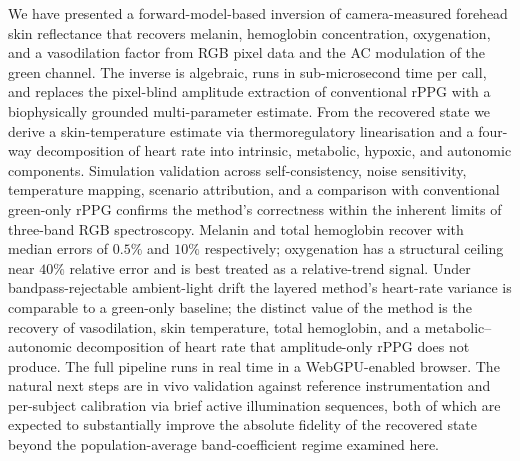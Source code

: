 \documentclass[10pt,twocolumn,a4paper]{article}
\theoremstyle{definition}
\begin{document}
We have presented a forward-model-based inversion of camera-measured
forehead skin reflectance that recovers melanin, hemoglobin
concentration, oxygenation, and a vasodilation factor from RGB pixel
data and the AC modulation of the green channel. The inverse is
algebraic, runs in sub-microsecond time per call, and replaces the
pixel-blind amplitude extraction of conventional rPPG with a
biophysically grounded multi-parameter estimate. From the recovered
state we derive a skin-temperature estimate via thermoregulatory
linearisation and a four-way decomposition of heart rate into
intrinsic, metabolic, hypoxic, and autonomic components. Simulation
validation across self-consistency, noise sensitivity, temperature
mapping, scenario attribution, and a comparison with conventional
green-only rPPG confirms the method's correctness within the
inherent limits of three-band RGB spectroscopy. Melanin and total
hemoglobin recover with median errors of $0.5\%$ and $10\%$
respectively; oxygenation has a structural ceiling near $40\%$
relative error and is best treated as a relative-trend signal.
Under bandpass-rejectable ambient-light drift the layered method's
heart-rate variance is comparable to a green-only baseline; the
distinct value of the method is the recovery of vasodilation, skin
temperature, total hemoglobin, and a metabolic--autonomic
decomposition of heart rate that amplitude-only rPPG does not
produce. The full pipeline runs in real time in a WebGPU-enabled
browser. The natural next steps are in vivo validation against
reference instrumentation and per-subject calibration via brief
active illumination sequences, both of which are expected to
substantially improve the absolute fidelity of the recovered state
beyond the population-average band-coefficient regime examined here.



\end{document}
